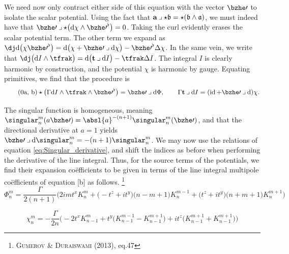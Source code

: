 \noindent
We need now only contract either side of this equation with the vector $\bzhe\prime$ to isolate the scalar potential.
Using the fact that $\avec\iprod\star\bfrak = \star(\bfrak\wedge\afrak)$, we must indeed have that $\bzhe\prime \iprod \star \big( \dee\chi \wedge {\bzhe\prime}^{\flat} \big) = 0$.
Taking the curl evidently erases the scalar potential term.
The other term we expand as $\codee\dee \big( \chi {\bzhe\prime}^{\flat} \big) = \dee \big( \chi + \bzhe\prime \iprod \dee\chi \big) - {\bzhe\prime}^{\flat}\Delta\chi$.
In the same vein, we write that $\codee \big( \dee I \wedge \tfrak \big) = \dee \big( \tvec \iprod \dee I \big) - \tfrak\Delta I$.
The integral $I$ is clearly harmonic by construction, and the potential $\chi$ is harmonic by gauge.
Equating primitives, we find that the procedure is
%
\begin{subequations}
  \begin{equation}\tag{\theequation{a, b}}
    \star\big( \Gamma \dee I \wedge \tfrak \wedge {\bzhe\prime}^{\flat} \big) = \bzhe\prime\iprod\dee\Phi, \qquad
    \Gamma\tvec \iprod \dee I = (\id + \bzhe\prime \iprod \dee)\chi.
  \end{equation}
\end{subequations}

\noindent
The singular function is homogeneous, meaning $\singular_n^m(a\bzhe\prime) = \absl{a}^{-(n+1)}\singular_n^m(\bzhe\prime)$, and that the directional derivative at $a = 1$ yields $\bzhe\prime \iprod \dee\singular_n^m = -(n+1) \singular_n^m$.
We may now use the relations of equation \eqref{eq:Singular_derivative}, and shift the indices as before when performing the derivative of the line integral.
Thus, for the source terms of the potentials, we find their expansion coëfficients to be given in terms of the line integral multipole coëfficients of equation \subeqref{\ref{eq:Q2X}}[b] as follows.%
\footnote{%
  \cite{gumerov2013efficient} \textsc{Gumerov} \& \textsc{Duraiswami} (2013), eq.47
}
%
\begin{equation}
  \Phi_n^m = \frac{\Gamma}{2(n+1)} \Big(
  2imt^x K_{n}^{m}
  + \big( -t^z + i t^y \big) \big( n-m+1 \big) K_{n}^{m-1}
  + \big( t^z + i t^y \big) \big( n+m+1 \big) K_{n}^{m+1}
  \Big)
\end{equation}

\begin{equation}
  \chi_n^m = -\frac{\Gamma}{2n} \Big(
  -2t^x K_{n-1}^{m}
  + t^y \big( K_{n-1}^{m-1} - K_{n-1}^{m+1} \big)
  + it^z \big( K_{n-1}^{m+1} + K_{n-1}^{m+1} \big)
  \Big)
\end{equation}

